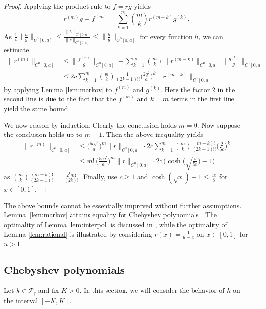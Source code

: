 \documentclass[10pt,reqno]{amsart}
\theoremstyle{definition}
\theoremstyle{remark}
\numberwithin{equation}{section}
\numberwithin{figure}{section}
\numberwithin{table}{section}
\begin{document}
\begin{proof}
Applying the product rule to $f=rg$ yields
$$
	r^{(m)} g = 
	f^{(m)} - \sum_{k=1}^m {m\choose k} r^{(m-k)} g^{(k)}.
$$
As $\frac{1}{c}\|\frac{h}{g}\|_{C^0[0,a]}
\le \frac{\|h\|_{C^0[0,a]}}{\|g\|_{C^0[0,a]}} \le
\|\frac{h}{g}\|_{C^0[0,a]}$ for every function $h$, we can estimate
\begin{align*}
	\|r^{(m)}\|_{C^0[0,a]} &\le
	\bigg\|
	\frac{f^{(m)}}{g}\bigg\|_{C^0[0,a]}
 	+ \sum_{k=1}^m {m\choose k} \|r^{(m-k)}\|_{C^0[0,a]}
	\bigg\|\frac{g^{(k)}}{g}\bigg\|_{C^0[0,a]}
\\
	&\le
	2c\sum_{k=1}^m {m\choose k} 
	\frac{1}{(2k-1)!!} \bigg(\frac{2q^2}{a}\bigg)^k
	\|r^{(m-k)}\|_{C^0[0,a]}
\end{align*}
by applying Lemma \ref{lem:markov} to $f^{(m)}$ and $g^{(k)}$. Here
the factor $2$ in the second line is due to the fact that
the $f^{(m)}$ and $k=m$ terms in the first line yield the same 
bound.

We now reason by induction. Clearly the conclusion holds $m=0$. 
Now suppose the conclusion holds up to $m-1$. Then the above
inequality yields
\begin{align*}
	\|r^{(m)}\|_{C^0[0,a]} &\le
	\bigg(\frac{5cq^2}{a}\bigg)^m
	\|r\|_{C^0[0,a]} 
	\cdot
	2c
	\sum_{k=1}^m {m\choose k} 
	\frac{(m-k)!}{(2k-1)!!} \bigg(\frac{2}{5c}\bigg)^k
\\
	&\le
	m!\,
	\bigg(\frac{5cq^2}{a}\bigg)^m
	\|r\|_{C^0[0,a]} 
	\cdot
	2c\,
	\Big(\cosh\Big(\sqrt{\tfrac{4}{5c}}\Big)-1\Big)
\end{align*}
as ${m\choose k} \frac{(m-k)!}{(2k-1)!!} =\frac{2^k m!}{(2k)!}$.
Finally, use
$c\ge 1$ and 
$\cosh(\sqrt{x})-1 \le \frac{5x}{8}$ for 
$x\in[0,1]$.
\end{proof}

The above bounds cannot be essentially improved without further 
assumptions. Lemma~\ref{lem:markov} attains equality for 
Chebyshev polynomials \cite[p.\ 256(d)]{BE95}. The optimality of Lemma 
\ref{lem:interpol} is discussed in \cite{CR92}, while the optimality of 
Lemma \ref{lem:rational} is illustrated by considering 
$r(x)=\frac{1}{u-x}$ on $x\in[0,1]$ for $u>1$.


\subsection{Chebyshev polynomials}

Let $h\in\mathcal{P}_q$ and fix $K>0$. In this section,
we will consider the behavior of $h$ on the interval $[-K,K]$.
\end{document}
